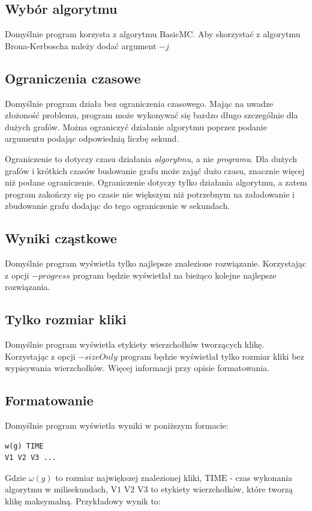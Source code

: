 \documentclass[12pt, a4paper]{article}
\begin{document}
\subsection{Wybór algorytmu}
Domyślnie program korzysta z algorytmu BasicMC. Aby skorzystać z algorytmu Brona-Kerboscha należy dodać argument $-j$

\subsection{Ograniczenia czasowe}
Domyślnie program działa bez ograniczenia czasowego. Mając na uwadze złożoność problemu, program może wykonywać się bardzo długo szczególnie dla dużych grafów. Można ograniczyć działanie algorytmu poprzez podanie argumentu \emph{} podając odpowiednią liczbę sekund.

Ograniczenie to dotyczy czasu działania \emph{algorytmu}, a nie \emph{programu}. Dla dużych grafów i krótkich czasów budowanie grafu może zająć dużo czasu, znacznie więcej niż podane ograniczenie. Ograniczenie dotyczy tylko działania algorytmu, a zatem program zakończy się po czasie nie większym niż potrzebnym na załadowanie i zbudowanie grafu dodając do tego ograniczenie w sekundach.

\subsection{Wyniki cząstkowe}
Domyślnie program wyświetla tylko najlepsze znalezione rozwiązanie. Korzystając z opcji $-progress$ program będzie wyświetlał na bieżąco kolejne najlepsze rozwiązania.

\subsection{Tylko rozmiar kliki}
Domyślnie program wyświetla etykiety wierzchołków tworzących klikę. Korzystając z opcji $-sizeOnly$ program będzie wyświetlał tylko rozmiar kliki bez wypisywania wierzchołków. Więcej informacji przy opisie formatowania.

\subsection{Formatowanie}
Domyślnie program wyświetla wyniki w poniższym formacie:

\begin{verbatim}
w(g) TIME
V1 V2 V3 ...
\end{verbatim}
Gdzie $\omega(g)$ to rozmiar największej znalezionej kliki, $\text{TIME}$ - czas wykonania algorytmu w milisekundach, $\text{V1 V2 V3}$ to etykiety wierzchołków, które tworzą klikę maksymalną. Przykładowy wynik to:
\end{document}
